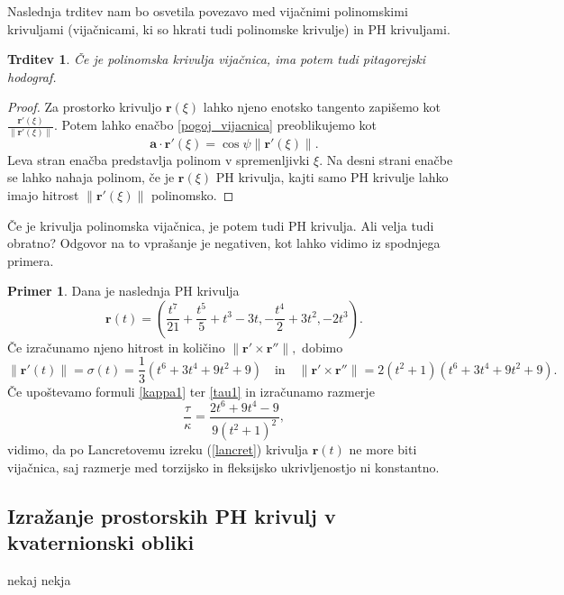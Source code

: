 \documentclass[12pt,a4paper,twoside]{article}
\theoremstyle{definition} %
\newtheorem{primer}[definicija]{Primer}
\theoremstyle{plain} %
\newtheorem{trditev}[definicija]{Trditev}
\numberwithin{equation}{section}  %
\begin{document}
Naslednja trditev nam bo osvetila povezavo med vijačnimi polinomskimi krivuljami (vijačnicami, ki so hkrati tudi polinomske krivulje) in PH krivuljami.\cite{faroukietal2004}
\begin{trditev}
	Če je polinomska krivulja vijačnica, ima potem tudi pitagorejski hodograf.
\end{trditev}
\begin{proof}
	Za prostorko krivuljo $\mathbf{r}(\xi)$ lahko njeno enotsko tangento zapišemo kot $\frac{\mathbf{r'}(\xi)}{\lVert \mathbf{r'}(\xi) \rVert}.$ Potem lahko enačbo \eqref{pogoj_vijacnica} preoblikujemo kot
	\begin{equation}
		\mathbf{a} \cdot \mathbf{r'}(\xi)=\cos \psi \lVert \mathbf{r'}(\xi) \rVert.
	\end{equation}
	Leva stran enačba predstavlja polinom v spremenljivki $\xi.$ Na desni strani enačbe se lahko nahaja polinom, če je $\mathbf{r}(\xi)$ PH krivulja, kajti samo PH krivulje lahko imajo hitrost $\lVert \mathbf{r'}(\xi) \rVert$ polinomsko.
\end{proof}
Če je krivulja polinomska vijačnica, je potem tudi PH krivulja. Ali velja tudi obratno? Odgovor na to vprašanje je negativen, kot lahko vidimo iz spodnjega primera.\cite{beltranmonterde}
\begin{primer}
	Dana je naslednja PH krivulja
	\begin{equation*}
		\mathbf{r}(t)=\left ( \frac{t^7}{21}+\frac{t^5}{5}+t^3-3t,-\frac{t^4}{2}+3t^2,-2t^3 \right ).
	\end{equation*}
	Če izračunamo njeno hitrost in količino $\lVert \mathbf{r'} \times \mathbf{r''} \rVert,$ dobimo
	\begin{equation*}
		\lVert \mathbf{r'}(t) \rVert=\sigma(t)=\frac{1}{3}(t^6+3t^4+9t^2+9) \quad \text{in} \quad \lVert \mathbf{r'} \times \mathbf{r''} \rVert=2(t^2+1)(t^6+3t^4+9t^2+9).
	\end{equation*}
	Če upoštevamo formuli \eqref{kappa1} ter \eqref{tau1} in izračunamo razmerje
	\begin{equation*}
		\frac{\tau}{\kappa}=\frac{2t^6+9t^4-9}{9(t^2+1)^2},
	\end{equation*}
	vidimo, da po Lancretovemu izreku (\ref{lancret}) krivulja $\mathbf{r}(t)$ ne more biti vijačnica, saj razmerje med torzijsko in fleksijsko ukrivljenostjo ni konstantno.
\end{primer}



\subsection{Izražanje prostorskih PH krivulj v kvaternionski obliki}
nekaj nekja
\end{document}
